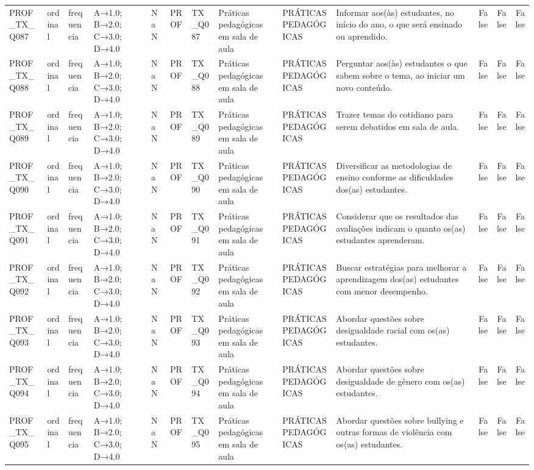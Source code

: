 \begin{tabular}{llllllllllrrr}
PROF\_TX\_Q087 & ordinal & frequencia & A→1.0; B→2.0; C→3.0; D→4.0 & NaN & PROF & TX\_Q087 & Práticas pedagógicas em sala de aula & PRÁTICAS PEDAGÓGICAS & Informar aos(às) estudantes, no início do ano, o que será  ensinado ou aprendido. & False & False & False \\
PROF\_TX\_Q088 & ordinal & frequencia & A→1.0; B→2.0; C→3.0; D→4.0 & NaN & PROF & TX\_Q088 & Práticas pedagógicas em sala de aula & PRÁTICAS PEDAGÓGICAS & Perguntar aos(às) estudantes o que sabem sobre o tema, ao iniciar um novo conteúdo. & False & False & False \\
PROF\_TX\_Q089 & ordinal & frequencia & A→1.0; B→2.0; C→3.0; D→4.0 & NaN & PROF & TX\_Q089 & Práticas pedagógicas em sala de aula & PRÁTICAS PEDAGÓGICAS & Trazer temas do cotidiano para serem debatidos em sala de aula. & False & False & False \\
PROF\_TX\_Q090 & ordinal & frequencia & A→1.0; B→2.0; C→3.0; D→4.0 & NaN & PROF & TX\_Q090 & Práticas pedagógicas em sala de aula & PRÁTICAS PEDAGÓGICAS & Diversificar as metodologias de ensino conforme as dificuldades dos(as) estudantes. & False & False & False \\
PROF\_TX\_Q091 & ordinal & frequencia & A→1.0; B→2.0; C→3.0; D→4.0 & NaN & PROF & TX\_Q091 & Práticas pedagógicas em sala de aula & PRÁTICAS PEDAGÓGICAS & Considerar que os resultados das avaliações indicam o quanto os(as) estudantes aprenderam. & False & False & False \\
PROF\_TX\_Q092 & ordinal & frequencia & A→1.0; B→2.0; C→3.0; D→4.0 & NaN & PROF & TX\_Q092 & Práticas pedagógicas em sala de aula & PRÁTICAS PEDAGÓGICAS & Buscar estratégias para melhorar a aprendizagem dos(as) estudantes com menor desempenho. & False & False & False \\
PROF\_TX\_Q093 & ordinal & frequencia & A→1.0; B→2.0; C→3.0; D→4.0 & NaN & PROF & TX\_Q093 & Práticas pedagógicas em sala de aula & PRÁTICAS PEDAGÓGICAS & Abordar questões sobre desigualdade racial com os(as) estudantes. & False & False & False \\
PROF\_TX\_Q094 & ordinal & frequencia & A→1.0; B→2.0; C→3.0; D→4.0 & NaN & PROF & TX\_Q094 & Práticas pedagógicas em sala de aula & PRÁTICAS PEDAGÓGICAS & Abordar questões sobre desigualdade de gênero com os(as) estudantes. & False & False & False \\
PROF\_TX\_Q095 & ordinal & frequencia & A→1.0; B→2.0; C→3.0; D→4.0 & NaN & PROF & TX\_Q095 & Práticas pedagógicas em sala de aula & PRÁTICAS PEDAGÓGICAS & Abordar questões sobre bullying e outras formas de violência com os(as)  estudantes. & False & False & False \\

\end{tabular}
